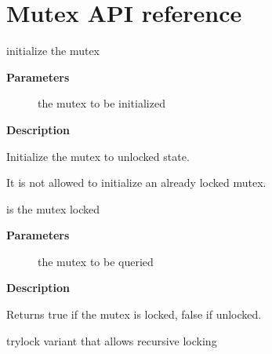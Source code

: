 \documentclass[a4paper,8pt,english]{sphinxmanual}
\begin{document}
\section{Mutex API reference}
\label{kernel-hacking/locking:mutex-api-reference}

\begin{fulllineitems}
\label{kernel-hacking/locking:c.mutex_init}
initialize the mutex

\end{fulllineitems}


\textbf{Parameters}
\begin{description}
\item[{}] \leavevmode
the mutex to be initialized

\end{description}

\textbf{Description}

Initialize the mutex to unlocked state.

It is not allowed to initialize an already locked mutex.

\begin{fulllineitems}
\label{kernel-hacking/locking:c.mutex_is_locked}
is the mutex locked

\end{fulllineitems}


\textbf{Parameters}
\begin{description}
\item[{}] \leavevmode
the mutex to be queried

\end{description}

\textbf{Description}

Returns true if the mutex is locked, false if unlocked.

\begin{fulllineitems}
\label{kernel-hacking/locking:c.mutex_trylock_recursive}
trylock variant that allows recursive locking

\end{fulllineitems}
\end{document}
